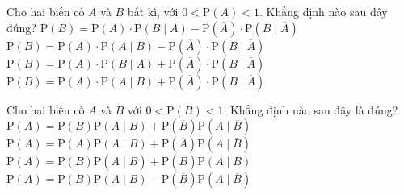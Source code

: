 

\begin{ex}%
	Cho hai biến cố $A$ và $B$ bất kì, với $0<\mathrm{P}(A)<1$.  Khẳng định nào sau đây đúng?
	\choice 
		 {$\mathrm{P}(B)=\mathrm{P}(A)\cdot\mathrm{P}\left(B\mid A\right)-\mathrm{P}\left(\overline{A}\right)\cdot\mathrm{P}\left(B\mid\overline{A}\right)$}
		{$\mathrm{P}(B)=\mathrm{P}(A)\cdot\mathrm{P}\left(A\mid B\right)-\mathrm{P}\left(\overline{A}\right)\cdot\mathrm{P}\left(B\mid\overline{A}\right)$} 
		{\True  $\mathrm{P}(B)=\mathrm{P}(A)\cdot\mathrm{P}\left(B\mid A\right)+\mathrm{P}\left(\overline{A}\right)\cdot\mathrm{P}\left(B\mid\overline{A}\right)$}
		{$\mathrm{P}(B)=\mathrm{P}(A)\cdot\mathrm{P}\left(A\mid B\right)+\mathrm{P}\left(\overline{A}\right)\cdot\mathrm{P}\left(B\mid\overline{A}\right)$} 
\end{ex}

\begin{ex}%
	Cho  hai biến cố $A$ và $B$ với $0< \mathrm{P}(B)< 1$. Khẳng định nào sau đây là đúng?
	 \choice
		{\True $\mathrm{P}\left(A\right)=\mathrm{P}\left(B\right)\mathrm{P}\left(A\mid  B\right)+\mathrm{P}\left(\overline{B}\right)\mathrm{P}\left(A\mid \overline{B}\right)$}
		{$\mathrm{P}\left(A\right)=\mathrm{P}\left(A\right)\mathrm{P}\left(A\mid B\right)+\mathrm{P}\left(\overline{A}\right)\mathrm{P}\left(A\mid \overline{B}\right)$} 
		{$\mathrm{P}\left(A\right)=\mathrm{P}\left(B\right)\mathrm{P}\left(A\mid \overline{B}\right)+\mathrm{P}\left(\overline{B}\right)\mathrm{P}\left(A\mid B\right)$} 
		{$\mathrm{P}\left(A\right)=\mathrm{P}\left(B\right)\mathrm{P}\left(A\mid B\right)-\mathrm{P}\left(\overline{B}\right)\mathrm{P}\left(A\mid \overline{B}\right)$} 
\end{ex}

